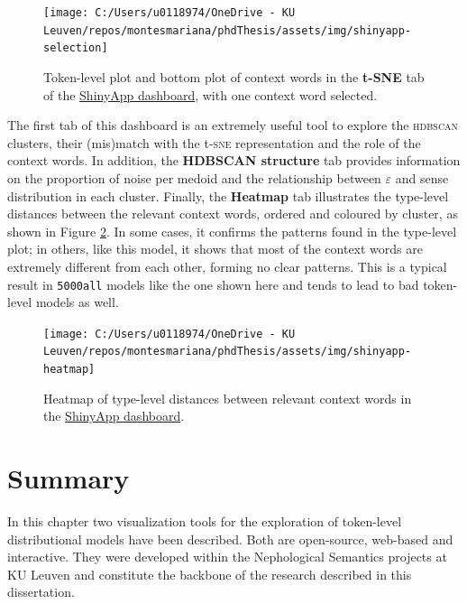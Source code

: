 \documentclass[
]{book}
\begin{document}
\begin{figure}
\texttt{[image: C:/Users/u0118974/OneDrive - KU Leuven/repos/montesmariana/phdThesis/assets/img/shinyapp-selection]} \caption{Token-level plot and bottom plot of context words in the \textbf{t-SNE} tab of the \href{https://marianamontes.shinyapps.io/Level3/}{ShinyApp dashboard}, with one context word selected.}\label{fig:shiny-bottom}
\end{figure}

The first tab of this dashboard is an extremely useful tool to explore the \textsc{hdbscan} clusters, their (mis)match with the t-\textsc{sne} representation and the role of the context words. In addition, the \textbf{HDBSCAN structure} tab provides information on the proportion of noise per medoid and the relationship between \(\varepsilon\) and sense distribution in each cluster. Finally, the \textbf{Heatmap} tab illustrates the type-level distances between the relevant context words, ordered and coloured by cluster, as shown in Figure \ref{fig:shiny-heatmap}. In some cases, it confirms the patterns found in the type-level plot; in others, like this model, it shows that most of the context words are extremely different from each other, forming no clear patterns. This is a typical result in \texttt{5000all} models like the one shown here and tends to lead to bad token-level models as well.



\begin{figure}
\texttt{[image: C:/Users/u0118974/OneDrive - KU Leuven/repos/montesmariana/phdThesis/assets/img/shinyapp-heatmap]} \caption{Heatmap of type-level distances between relevant context words in the \href{https://marianamontes.shinyapps.io/Level3/}{ShinyApp dashboard}.}\label{fig:shiny-heatmap}
\end{figure}

\hypertarget{nepho-summary}{%
\section{Summary}\label{nepho-summary}}

In this chapter two visualization tools for the exploration of token-level distributional models have been described. Both are open-source, web-based and interactive. They were developed within the Nephological Semantics projects at KU Leuven and constitute the backbone of the research described in this dissertation.
\end{document}
